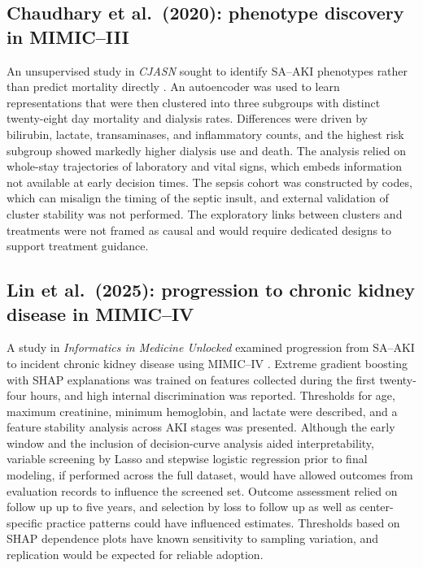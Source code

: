 \subsection{Chaudhary et al.\ (2020): phenotype discovery in MIMIC--III}
An unsupervised study in \emph{CJASN} sought to identify SA--AKI phenotypes rather than predict mortality directly \citep{Chaudhary_2020_CJASN}. An autoencoder was used to learn representations that were then clustered into three subgroups with distinct twenty-eight day mortality and dialysis rates. Differences were driven by bilirubin, lactate, transaminases, and inflammatory counts, and the highest risk subgroup showed markedly higher dialysis use and death. The analysis relied on whole-stay trajectories of laboratory and vital signs, which embeds information not available at early decision times. The sepsis cohort was constructed by codes, which can misalign the timing of the septic insult, and external validation of cluster stability was not performed. The exploratory links between clusters and treatments were not framed as causal and would require dedicated designs to support treatment guidance.

\subsection{Lin et al.\ (2025): progression to chronic kidney disease in MIMIC--IV}
A study in \emph{Informatics in Medicine Unlocked} examined progression from SA--AKI to incident chronic kidney disease using MIMIC--IV \citep{Lin_2025_IMU}. Extreme gradient boosting with SHAP explanations was trained on features collected during the first twenty-four hours, and high internal discrimination was reported. Thresholds for age, maximum creatinine, minimum hemoglobin, and lactate were described, and a feature stability analysis across AKI stages was presented. Although the early window and the inclusion of decision-curve analysis aided interpretability, variable screening by Lasso and stepwise logistic regression prior to final modeling, if performed across the full dataset, would have allowed outcomes from evaluation records to influence the screened set. Outcome assessment relied on follow up up to five years, and selection by loss to follow up as well as center-specific practice patterns could have influenced estimates. Thresholds based on SHAP dependence plots have known sensitivity to sampling variation, and replication would be expected for reliable adoption.

